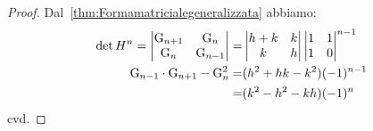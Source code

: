 \begin{proof}
Dal~\vref{thm:Formamatricialegeneralizzata} abbiamo:
\begin{align*}
	\det H^n=\begin{vmatrix}
		\mathrm{G}_{n+1}&\mathrm{G}_{n}\\\mathrm{G}_{n}&\mathrm{G}_{n-1}
	\end{vmatrix}=&\begin{vmatrix}
		h+k&k\\k&h\\
	\end{vmatrix}\begin{vmatrix}
		1&1\\ 1&0\\
	\end{vmatrix}^{n-1}\\
\mathrm{G}_{n-1}\cdot\mathrm{G}_{n+1}-\mathrm{G}_{n}^2=&(h^2+hk-k^2)(-1)^{n-1}\\
=&(k^2-h^2-kh)(-1)^{n}\\
\end{align*}
cvd.
\end{proof}